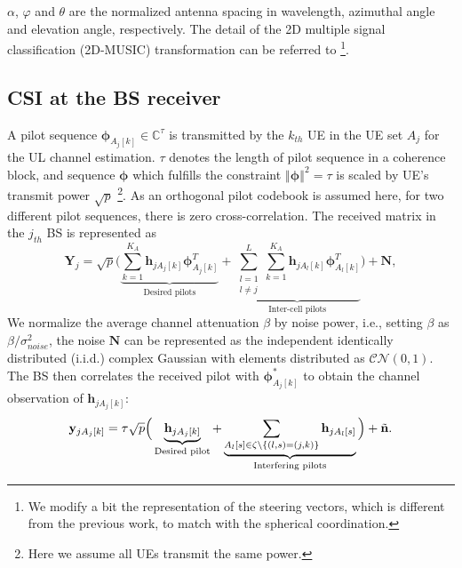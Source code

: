 $\alpha$, $\varphi$ and $\theta$ are the normalized antenna spacing in %
wavelength, azimuthal angle and elevation angle, respectively. The detail of the 2D multiple signal classification (2D-MUSIC) transformation can be referred to \cite{Chen2018pilot}\footnote{We modify a bit the representation of the steering vectors, which is different from the previous work, to match with the spherical coordination.}.%

\subsection{CSI at the BS receiver}
A pilot sequence $\mathbf{\phi}_{A_j[k]}\in \mathbb{C}^{\tau} $ is transmitted by the $k_{th}$ UE in the UE set $A_j$ for the UL channel estimation. $\tau$ denotes the length of pilot sequence in a coherence block, and sequence $\mathbf{{\phi}}$ which fulfills the constraint $\left\Vert\mathbf{\phi}\right\Vert^2=\tau$ is scaled by UE's transmit power $\sqrt{p}$ \footnote{Here we assume all UEs transmit the same power. }. As an orthogonal pilot codebook is assumed here, for two different pilot sequences, there is zero cross-correlation.  The received matrix in the $j_{th}$ BS is represented as 
\begin{equation} \label{eq:Yj}
\mathbf{Y}_j = \sqrt{p}\Big(\underbrace{\sum_{k = 1}^{K_A} \mathbf{h}_{jA_j[k]} \mathbf{\phi}_{A_j[k]}^T}_\text{Desired pilots} +\underbrace{\sum_{\substack{l=1 \\ l\neq j}}^{L}\sum_{k = 1}^{K_A} \mathbf{h}_{jA_l[k]} \mathbf{\phi}_{A_l[k]}^T}_\text{Inter-cell pilots}\Big) + \mathbf{N},   
\end{equation}
We normalize the average channel attenuation $\beta$ by noise power, i.e., setting $\beta$ as $\beta/\sigma^2_{noise}$, the noise $\mathbf{N}$ can be represented as the independent identically distributed
(i.i.d.) complex Gaussian with elements distributed as $\mathcal{CN\left(\mathit{0,1}\right)}$.
The BS then correlates the received pilot with $\mathbf{\phi}_{A_j[k]}^*$ to obtain the channel observation of $\mathbf{h}_{jA_j[k]}$:%
\begin{equation} 
\mathbf{y}_{jA_j[k]} = \tau\sqrt{p}\Big(\underbrace{\mathbf{h}_{jA_j[k]}}_\text{Desired pilot} +\underbrace{\sum_{A_l[s]\in \\ \zeta\char`\\\{(l,s) = (j,k)\}}\mathbf{h}_{jA_l[s]}}_\text{Interfering pilots}\Big) + \tilde{\mathbf{n}}.   \label{eq:pilot contamination}
\end{equation}
